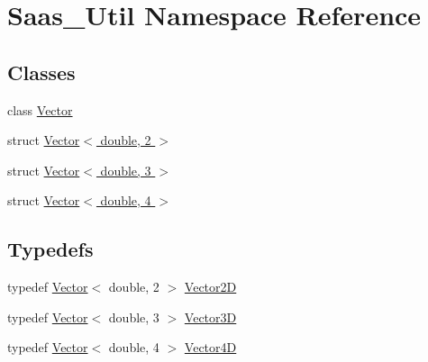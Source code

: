 \hypertarget{namespace_saas___util}{}\section{Saas\+\_\+\+Util Namespace Reference}
\label{namespace_saas___util}
\subsection*{Classes}
\begin{DoxyCompactItemize}
\item 
class \hyperlink{class_saas___util_1_1_vector}{Vector}
\item 
struct \hyperlink{struct_saas___util_1_1_vector_3_01double_00_012_01_4}{Vector$<$ double, 2 $>$}
\item 
struct \hyperlink{struct_saas___util_1_1_vector_3_01double_00_013_01_4}{Vector$<$ double, 3 $>$}
\item 
struct \hyperlink{struct_saas___util_1_1_vector_3_01double_00_014_01_4}{Vector$<$ double, 4 $>$}
\end{DoxyCompactItemize}
\subsection*{Typedefs}
\begin{DoxyCompactItemize}
\item 
typedef \hyperlink{class_saas___util_1_1_vector}{Vector}$<$ double, 2 $>$ \hyperlink{namespace_saas___util_a9142c27b864f179a6b89e082b9ecf031}{Vector2\+D}
\item 
typedef \hyperlink{class_saas___util_1_1_vector}{Vector}$<$ double, 3 $>$ \hyperlink{namespace_saas___util_aa7cd6c60d40d077fa462d922096a5234}{Vector3\+D}
\item 
typedef \hyperlink{class_saas___util_1_1_vector}{Vector}$<$ double, 4 $>$ \hyperlink{namespace_saas___util_a10ff8b47bd08ba3f577c6fbbce374c7c}{Vector4\+D}
\end{DoxyCompactItemize}


